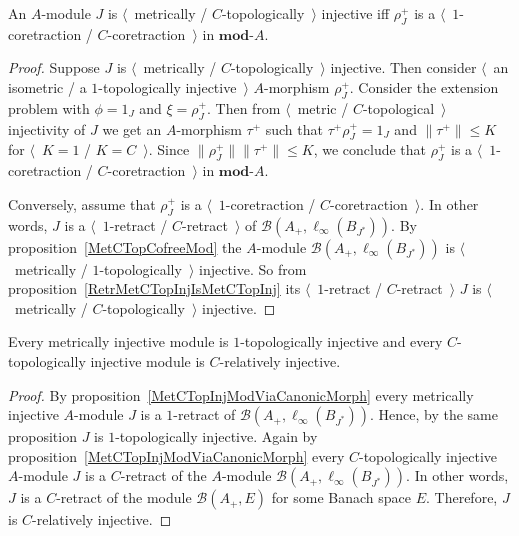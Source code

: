 \begin{proposition}\label{MetCTopInjModViaCanonicMorph} An $A$-module $J$ is
$\langle$~metrically / $C$-topologically~$\rangle$ injective iff $\rho_J^+$ is 
a $\langle$~$1$-coretraction / $C$-coretraction~$\rangle$ in $\mathbf{mod}\text{-}A$.
\end{proposition}
\begin{proof}
Suppose $J$ is 
$\langle$~metrically / $C$-topologically~$\rangle$ injective. Then consider 
$\langle$~an isometric / a $1$-topologically injective~$\rangle$
$A$-morphism $\rho_J^+$. Consider the extension problem with $\phi=1_J$ 
and $\xi=\rho_J^+$. Then from $\langle$~metric / $C$-topological~$\rangle$ 
injectivity of $J$ we get an $A$-morphism $\tau^+$ such 
that $\tau^+\rho_J^+=1_J$
and $\lVert\tau^+\rVert\leq K$ for $\langle$~$K=1$ / $K=C$~$\rangle$. 
Since $\lVert\rho_J^+\rVert\lVert \tau^+\rVert\leq K$, 
we conclude that $\rho_J^+$ is 
a $\langle$~$1$-coretraction / $C$-coretraction~$\rangle$ in $\mathbf{mod}\text{-}A$.

Conversely, assume that $\rho_J^+$ is 
a $\langle$~$1$-coretraction / $C$-coretraction~$\rangle$. In other words, $J$ is 
a $\langle$~$1$-retract / $C$-retract~$\rangle$ of 
$\mathcal{B}(A_+, \ell_\infty(B_{J^*}))$. By proposition~\ref{MetCTopCofreeMod} 
the $A$-module $\mathcal{B}(A_+, \ell_\infty(B_{J^*}))$ 
is $\langle$~metrically / $1$-topologically~$\rangle$ injective. So from 
proposition~\ref{RetrMetCTopInjIsMetCTopInj} 
its $\langle$~$1$-retract / $C$-retract~$\rangle$ $J$ is 
$\langle$~metrically / $C$-topologically~$\rangle$ injective.
\end{proof}

\begin{proposition}\label{MetInjIsTopInjAndTopInjIsRelInj} Every metrically
injective module is $1$-topologically injective and every $C$-topologically 
injective module is $C$-relatively injective.
\end{proposition}
\begin{proof} By proposition~\ref{MetCTopInjModViaCanonicMorph} every 
metrically injective $A$-module $J$ is a $1$-retract 
of $\mathcal{B}(A_+, \ell_\infty(B_{J^*}))$. Hence, by the same proposition $J$ 
is $1$-topologically injective. Again by 
proposition~\ref{MetCTopInjModViaCanonicMorph} every $C$-topologically 
injective $A$-module $J$ is a $C$-retract 
of the $A$-module $\mathcal{B}(A_+, \ell_\infty(B_{J^*}))$. 
In other words, $J$ is a $C$-retract of the module $\mathcal{B}(A_+, E)$ for 
some Banach space $E$. Therefore, $J$ is $C$-relatively injective.
\end{proof}

